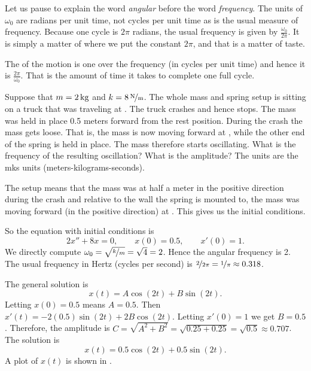 Let us pause to explain the word \emph{angular}
before the word \emph{frequency}.
The units of
$\omega_0$ are radians per unit time, not cycles per unit time 
as is the usual measure of frequency.  Because one cycle is $2
\pi$ radians, the usual frequency is given by $\frac{\omega_0}{2\pi}$.
It is simply a matter of where we put the constant $2\pi$, and that is a
matter of taste.

The \emph{} of the motion is one over the frequency (in cycles per unit
time) and hence it is $\frac{2\pi}{\omega_0}$.  That is the amount of time it takes
to complete one full cycle.


\begin{example}
Suppose that $m=\unit[2]{kg}$ and $k=\unitfrac[8]{N}{m}$.
The whole mass and spring setup is sitting on
a truck that was traveling at .
The truck crashes and hence stops.
The mass was held in place 0.5 meters forward from the rest position.  During
the crash the mass gets loose.  That is, the mass is now 
moving forward at , while the other end of the
spring is held
in place.  The mass therefore starts oscillating.
What is the frequency of the resulting oscillation?  What is the amplitude?
The units are the mks units (meters-kilograms-seconds).

The setup means that the mass was at half a meter in the positive
direction during the crash and
relative to the wall the spring is mounted to, the mass was moving forward
(in the positive direction) at .  This gives us the initial
conditions.

So the equation with initial conditions is
\begin{equation*}
2 x'' + 8 x = 0 , \qquad x(0) = 0.5, \qquad x'(0) = 1.
\end{equation*}
We directly compute $\omega_0 = \sqrt{\nicefrac{k}{m}} = \sqrt{4} = 2$.
Hence the angular frequency is 2.  The usual frequency in Hertz (cycles per
second) is $\nicefrac{2}{2\pi} = \nicefrac{1}{\pi} \approx 0.318$.

The general solution is
\begin{equation*}
x(t) = A \cos (2t) + B \sin (2t) .
\end{equation*}
Letting $x(0) = 0.5$ means $A = 0.5$.  Then $x'(t) = - 2(0.5) \sin (2t)
+ 2B \cos (2t)$.
Letting $x'(0) = 1$ we get $B = 0.5$.  Therefore, the amplitude is
$C = \sqrt{A^2+B^2} = \sqrt{0.25+0.25} = \sqrt{0.5} \approx 0.707$.  The solution is
\begin{equation*}
x(t) = 0.5 \cos (2t) + 0.5 \sin (2t) .
\end{equation*}
A plot of $x(t)$ is shown in .
\end{example}

